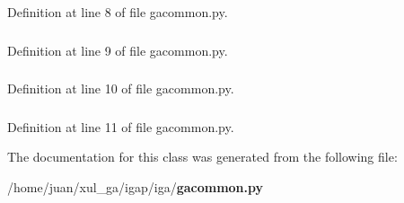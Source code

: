 Definition at line 8 of file gacommon.py.
\subsubsection{}\label{classiga_1_1gacommon_1_1PeerNode_37989115ba2610360e586088110099d9}




Definition at line 9 of file gacommon.py.
\subsubsection{}\label{classiga_1_1gacommon_1_1PeerNode_66496f329a66c4ba20b78cc38b2544b9}




Definition at line 10 of file gacommon.py.
\subsubsection{}\label{classiga_1_1gacommon_1_1PeerNode_cf40536d662407eb5b75fc01ce7c1c7e}




Definition at line 11 of file gacommon.py.

The documentation for this class was generated from the following file:\begin{CompactItemize}
\item 
/home/juan/xul\_\-ga/igap/iga/{\bf gacommon.py}\end{CompactItemize}
